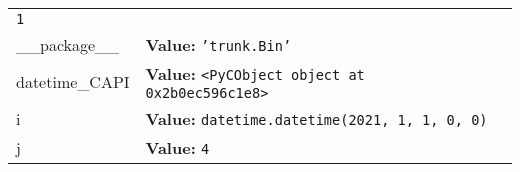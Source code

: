 \begin{longtable}{|p{\varnamewidth}|p{\vardescrwidth}|l}
{\tt 1}&\\
\cline{1-2}
\raggedright \_\-\_\-p\-a\-c\-k\-a\-g\-e\-\_\-\_\- & \raggedright \textbf{Value:} 
{\tt \texttt{'}\texttt{trunk.Bin}\texttt{'}}&\\
\cline{1-2}
\raggedright d\-a\-t\-e\-t\-i\-m\-e\-\_\-C\-A\-P\-I\- & \raggedright \textbf{Value:} 
{\tt {\textless}PyCObject object at 0x2b0ec596c1e8{\textgreater}}&\\
\cline{1-2}
\raggedright i\- & \raggedright \textbf{Value:} 
{\tt datetime.datetime(2021, 1, 1, 0, 0)}&\\
\cline{1-2}
\raggedright j\- & \raggedright \textbf{Value:} 
{\tt 4}&\\
\cline{1-2}
\end{longtable}

